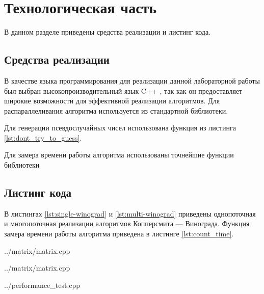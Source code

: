 \chapter{Технологическая часть}

В данном разделе приведены средства реализации и листинг кода.

\section{Средства реализации}

В качестве языка программирования для реализации данной лабораторной работы был выбран высокопроизводительный язык C++ \cite{cpp17}, так как он предоставляет широкие возможности для эффективной реализации алгоритмов.
Для распараллеливания алгоритма используется  из стандартной библиотеки.

Для генерации псевдослучайных чисел использована функция из листинга \ref{lst:dont_try_to_guess}.

Для замера времени работы алгоритма использованы точнейшие функции библиотеки 

\section{Листинг кода}

В листингах \ref{lst:single-winograd} и \ref{lst:multi-winograd} приведены однопоточная и многопоточная реализации алгоритмов Копперсмита — Винограда.
Функция замера времени работы алгоритма приведена в листинге \ref{lst:count_time}.

\begin{lstinputlisting}[
	caption={Последовательный алгоритм Копперсмита — Винограда},
	label={lst:single-winograd},
	style={cpp},
	linerange={5-67}
]{../matrix/matrix.cpp}
\end{lstinputlisting}

\begin{lstinputlisting}[
	caption={Параллельный алгоритм Копперсмита — Винограда},
	label={lst:multi-winograd},
	style={cpp},
	linerange={69-167}
]{../matrix/matrix.cpp}
\end{lstinputlisting}

\begin{lstinputlisting}[
	caption={Продвинутый генератор псевдослучайных чисел},
	label={lst:dont_try_to_guess},
	style={cpp},
	linerange={8-12}
]{../performance_test.cpp}
\end{lstinputlisting}

